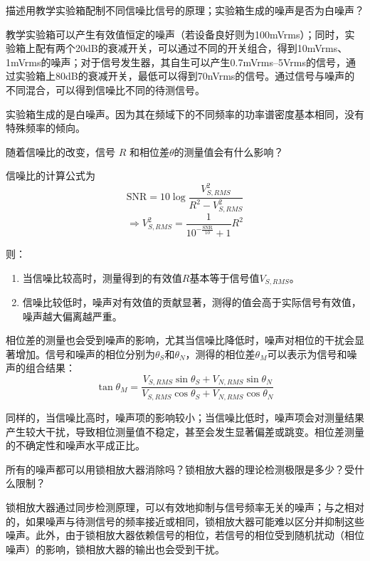 \documentclass[dvipsnames, svgnames,a4paper,11pt]{article}
\begin{document}
\begin{question}
	描述用教学实验箱配制不同信噪比信号的原理；实验箱生成的噪声是否为白噪声？
\end{question}

	教学实验箱可以产生有效值恒定的噪声（若设备良好则为100mVrms）；同时，实验箱上配有两个20dB的衰减开关，可以通过不同的开关组合，得到10mVrms、1mVrms的噪声；对于信号发生器，其自生可以产生0.7mVrms--5Vrms的信号，通过实验箱上80dB的衰减开关，最低可以得到70nVrms的信号。通过信号与噪声的不同混合，可以得到信噪比不同的待测信号。

	实验箱生成的是白噪声。因为其在频域下的不同频率的功率谱密度基本相同，没有特殊频率的倾向。






\begin{question}
	随着信噪比的改变，信号 $R$ 和相位差$\theta$的测量值会有什么影响？
\end{question}

	信噪比的计算公式为
	\[
		\mathrm{SNR} = 10\log\frac{V_{S,RMS}^2}{R^2 - V_{S,RMS}^2}
	\]
	\[
		\Rightarrow V_{S,RMS}^2 = \frac{1}{10^{-\frac{\mathrm{SNR}}{10}} + 1} R^2
	\]

	则：
	\begin{enumerate}
		\item 当信噪比较高时，测量得到的有效值$R$基本等于信号值$V_{S,RMS}$。
		\item 信噪比较低时，噪声对有效值的贡献显著，测得的值会高于实际信号有效值，噪声越大偏离越严重。
	\end{enumerate}

	相位差的测量也会受到噪声的影响，尤其当信噪比降低时，噪声对相位的干扰会显著增加。信号和噪声的相位分别为$\theta_{S}$和$\theta_{N}$，测得的相位差$\theta_{M}$可以表示为信号和噪声的组合结果：
	\[
		\tan \theta_{M} = \frac{V_{S,RMS}\sin\theta_{S} + V_{N,RMS}\sin\theta_{N}}{V_{S,RMS}\cos\theta_{S} + V_{N,RMS}\cos\theta_{N}}
	\]

	同样的，当信噪比高时，噪声项的影响较小；当信噪比低时，噪声项会对测量结果产生较大干扰，导致相位测量值不稳定，甚至会发生显著偏差或跳变。相位差测量的不确定性和噪声水平成正比。


\begin{question}
	所有的噪声都可以用锁相放大器消除吗？锁相放大器的理论检测极限是多少？受什么限制？
\end{question}

	锁相放大器通过同步检测原理，可以有效地抑制与信号频率无关的噪声；与之相对的，如果噪声与待测信号的频率接近或相同，锁相放大器可能难以区分并抑制这些噪声。此外，由于锁相放大器依赖信号的相位，若信号的相位受到随机扰动（相位噪声）的影响，锁相放大器的输出也会受到干扰。
\end{document}

